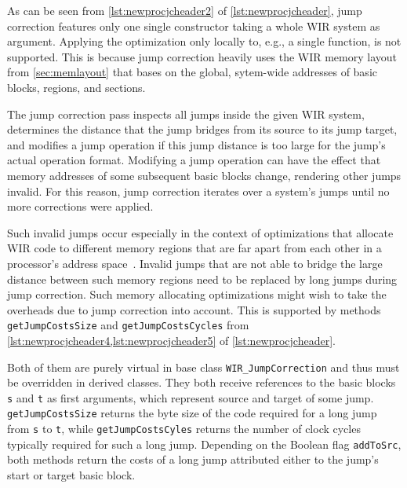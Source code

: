 As can be seen from \cref{lst:newprocjcheader2} of \cref{lst:newprocjcheader}, jump correction features only one single constructor taking a whole \gls{WIR} system as argument.
Applying the optimization only locally to, e.g., a single function, is not supported.
This is because jump correction heavily uses the \gls{WIR} memory layout from \cref{sec:memlayout} that bases on the global, sytem-wide addresses of basic blocks, regions, and sections.

The jump correction pass inspects all jumps inside the given \gls{WIR} system, determines the distance that the jump bridges from its source to its jump target, and modifies a jump operation if this jump distance is too large for the jump's actual operation format.
Modifying a jump operation can have the effect that memory addresses of some subsequent basic blocks change, rendering other jumps invalid.
For this reason, jump correction iterates over a system's jumps until no more corrections were applied.

Such invalid jumps occur especially in the context of optimizations that allocate \gls{WIR} code to different memory regions that are far apart from each other in a processor's address space~\cite{OLF16}.
Invalid jumps that are not able to bridge the large distance between such memory regions need to be replaced by long jumps during jump correction.
Such memory allocating optimizations might wish to take the overheads due to jump correction into account.
This is supported by methods \texttt{getJumpCostsSize} and \texttt{getJumpCostsCycles} from \cref{lst:newprocjcheader4,lst:newprocjcheader5} of \cref{lst:newprocjcheader}.

Both of them are purely virtual in base class \texttt{WIR\_JumpCorrection} and thus must be overridden in derived classes.
They both receive references to the basic blocks \texttt{s} and \texttt{t} as first arguments, which represent source and target of some jump.
\texttt{getJumpCostsSize} returns the byte size of the code required for a long jump from \texttt{s} to \texttt{t}, while \texttt{getJumpCostsCyles} returns the number of clock cycles typically required for such a long jump.
Depending on the Boolean flag \texttt{addToSrc}, both methods return the costs of a long jump attributed either to the jump's start or target basic block.

